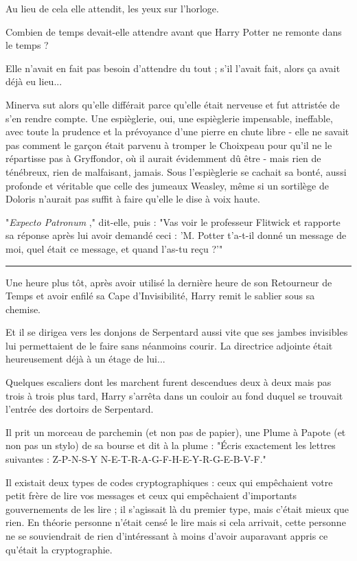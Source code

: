 Au lieu de cela elle attendit, les yeux sur l'horloge.

Combien de temps devait-elle attendre avant que Harry Potter ne remonte dans le temps ?

Elle n'avait en fait pas besoin d'attendre du tout ; s'il l'avait fait, alors ça avait déjà eu lieu...

Minerva sut alors qu'elle différait parce qu'elle était nerveuse et fut attristée de s'en rendre compte. Une espièglerie, oui, une espièglerie impensable, ineffable, avec toute la prudence et la prévoyance d'une pierre en chute libre - elle ne savait pas comment le garçon était parvenu à tromper le Choixpeau pour qu'il ne le répartisse pas à Gryffondor, où il aurait évidemment dû être - mais rien de ténébreux, rien de malfaisant, jamais. Sous l'espièglerie se cachait sa bonté, aussi profonde et véritable que celle des jumeaux Weasley, même si un sortilège de Doloris n'aurait pas suffit à faire qu'elle le dise à voix haute.

"\emph{Expecto Patronum} ," dit-elle, puis : "Vas voir le professeur Flitwick et rapporte sa réponse après lui avoir demandé ceci : 'M. Potter t'a-t-il donné un message de moi, quel était ce message, et quand l'as-tu reçu ?'"
\par\noindent\rule{\textwidth}{0.4pt}
Une heure plus tôt, après avoir utilisé la dernière heure de son Retourneur de Temps et avoir enfilé sa Cape d'Invisibilité, Harry remit le sablier sous sa chemise.

Et il se dirigea vers les donjons de Serpentard aussi vite que ses jambes invisibles lui permettaient de le faire sans néanmoins courir. La directrice adjointe était heureusement déjà à un étage de lui...

Quelques escaliers dont les marchent furent descendues deux à deux mais pas trois à trois plus tard, Harry s'arrêta dans un couloir au fond duquel se trouvait l'entrée des dortoirs de Serpentard.

Il prit un morceau de parchemin (et non pas de papier), une Plume à Papote (et non pas un stylo) de sa bourse et dit à la plume : "Écris exactement les lettres suivantes : Z-P-N-S-Y N-E-T-R-A-G-F-H-E-Y-R-G-E-B-V-F."

Il existait deux types de codes cryptographiques : ceux qui empêchaient votre petit frère de lire vos messages et ceux qui empêchaient d'importants gouvernements de les lire ; il s'agissait là du premier type, mais c'était mieux que rien. En théorie personne n'était censé le lire mais si cela arrivait, cette personne ne se souviendrait de rien d'intéressant à moins d'avoir auparavant appris ce qu'était la cryptographie.


